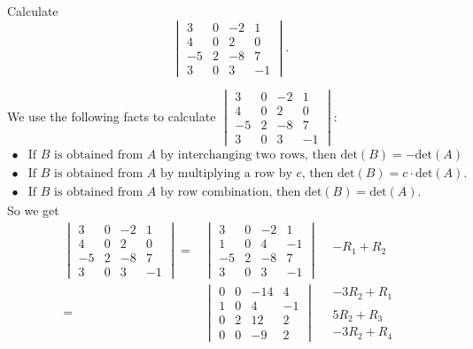 \documentclass[12pt]{article}
\newenvironment{problem}[2][Problem]
{
	\begin{trivlist} 
		\item[\hskip \labelsep {\bfseries #1 #2:}]
	}
{
	\end{trivlist}
	}
\newenvironment{solution}[1][Solution]
{
	\begin{trivlist} 
		\item[\hskip \labelsep {\itshape #1:}]
	}
	{
	\end{trivlist}
}
\begin{document}
\begin{problem}{1}
Calculate
\[
\begin{vmatrix} 3&0&-2&1\\4&0&2&0\\-5&2&-8&7\\3&0&3&-1\end{vmatrix}\text{.}
\]
\noindent
\begin{solution}
We use the following facts to calculate $\begin{vmatrix} 3&0&-2&1\\4&0&2&0\\-5&2&-8&7\\3&0&3&-1\end{vmatrix}$:
\begin{align*}
\bullet& \text{If $B$ is obtained from $A$ by interchanging two rows, then $\text{det}(B)=-\text{det}(A)$}.\\
\bullet& \text{If $B$ is obtained from $A$ by multiplying a row by $c$, then $\text{det}(B)=c\cdot \text{det}(A)$.}\\
\bullet& \text{If $B$ is obtained from $A$ by row combination, then $\text{det}(B)=\text{det}(A)$.}
\end{align*}
So we get
\begin{align*}
\begin{vmatrix} 3&0&-2&1\\4&0&2&0\\-5&2&-8&7\\3&0&3&-1\end{vmatrix} =& \begin{vmatrix} 3&0&-2&1\\1&0&4&-1\\-5&2&-8&7\\3&0&3&-1 \end{vmatrix} & \begin{matrix} \text{} \\ -R_1+R_2\text{} \\ \text{} \\ \text{} \end{matrix} \\
%
=& \begin{vmatrix} 0&0&-14&4\\1&0&4&-1\\0&2&12&2\\0&0&-9&2 \end{vmatrix} & \begin{matrix} -3R_2+R_1\text{} \\ \text{} \\ 5R_2+R_3\text{} \\ -3R_2+R_4\text{} \end{matrix} \\

\end{align*}
\end{solution}
\end{problem}
\end{document}
